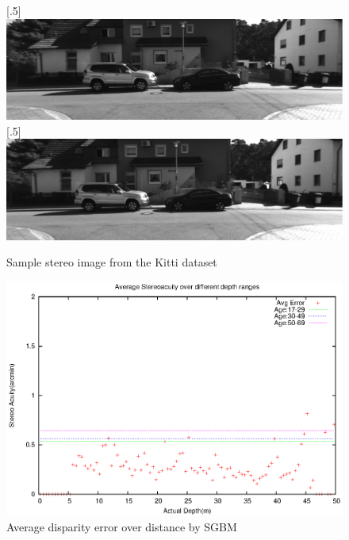 \begin{figure}[h!]
\centering
{}
[.5\linewidth]{\includegraphics[scale=0.21]{000005L}}%
[.5\linewidth]{\includegraphics[scale=0.21]{000005R}}%
\caption{Sample stereo image from the Kitti dataset}
\label{fig:img5}
\end{figure}

\begin{figure}[H]
\centering
\includegraphics[scale=0.8]{sgbmimg5pix3msk}
\caption{Average disparity error over distance by SGBM}
\label{fig:imgmsk5}
\end{figure} 

